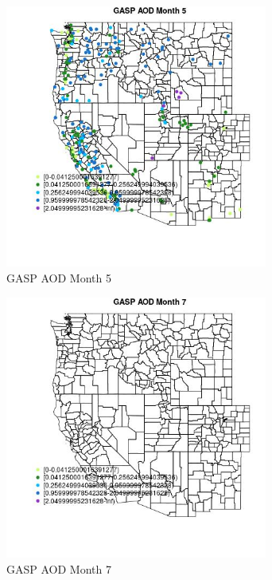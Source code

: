 \begin{figure} 
\centering  
\includegraphics[width=0.77\textwidth]{Code_Outputs/Report_ML_input_PM25_Step4_part_e_de_duplicated_aves_compiled_2019-05-18wNAs_MapObsMo5GASP_AOD.jpg} 
\caption{\label{fig:Report_ML_input_PM25_Step4_part_e_de_duplicated_aves_compiled_2019-05-18wNAsMapObsMo5GASP_AOD}GASP AOD Month 5} 
\end{figure} 
 

\begin{figure} 
\centering  
\includegraphics[width=0.77\textwidth]{Code_Outputs/Report_ML_input_PM25_Step4_part_e_de_duplicated_aves_compiled_2019-05-18wNAs_MapObsMo7GASP_AOD.jpg} 
\caption{\label{fig:Report_ML_input_PM25_Step4_part_e_de_duplicated_aves_compiled_2019-05-18wNAsMapObsMo7GASP_AOD}GASP AOD Month 7} 
\end{figure} 
 

